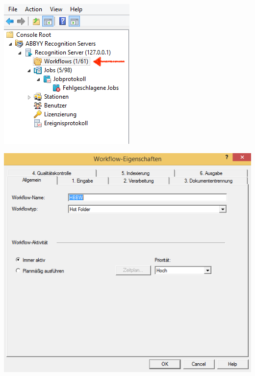 \vspace*{0.3cm}
\begin{minipage}{0.4\textwidth} 
\begin{center}
\includegraphics[scale=0.7]{main.png}
\end{center}
\end{minipage}
\begin{minipage}{0.4\textwidth}
\begin{center}
\includegraphics[scale=0.42]{0_allgemein.png}
\end{center}
\end{minipage}


